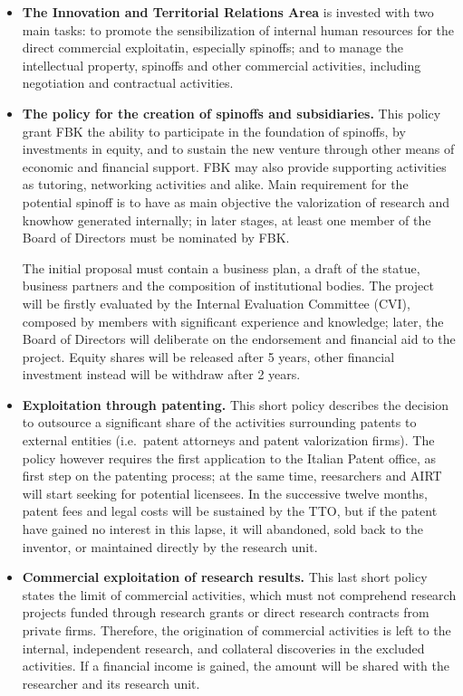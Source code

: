 \begin{itemize}

\item \textbf{The Innovation and Territorial Relations Area} is invested with two main tasks: to promote the sensibilization of internal human resources for the direct commercial exploitatin, especially spinoffs; and to manage the intellectual property, spinoffs and other commercial activities, including negotiation and contractual activities. 

\item \textbf{The policy for the creation of spinoffs and subsidiaries.} This policy grant FBK the ability to participate in the foundation of spinoffs, by investments in equity, and to sustain the new venture through other means of economic and financial support. FBK may also provide supporting activities as tutoring, networking activities and alike. Main requirement for the potential spinoff is to have as main objective the valorization of research and knowhow generated internally; in later stages, at least one member of the Board of Directors must be nominated by FBK.

The initial proposal must contain a business plan, a draft of the statue, business partners and the composition of institutional bodies. The project will be firstly evaluated by the Internal Evaluation Committee (CVI), composed by members with significant experience and knowledge; later, the Board of Directors will deliberate on the endorsement and financial aid to the project. Equity shares will be released after 5 years, other financial investment instead will be withdraw after 2 years.

\item \textbf{Exploitation through patenting.} This short policy describes the decision to outsource a significant share of the activities surrounding patents to external entities (i.e.\ patent attorneys and patent valorization firms). The policy however requires the first application to the Italian Patent office, as first step on the patenting process; at the same time, reesarchers and AIRT will start seeking for potential licensees. In the successive twelve months, patent fees and legal costs will be sustained by the TTO, but if the patent have gained no interest in this lapse, it will abandoned, sold back to the inventor, or maintained directly by the research unit. 

\item \textbf{Commercial exploitation of research results.} This last short policy states the limit of commercial activities, which must not comprehend research projects funded through research grants or direct research contracts from private firms. Therefore, the origination of commercial activities is left to the internal, independent research, and collateral discoveries in the excluded activities. If a financial income is gained, the amount will be shared with the researcher and its research unit.

\end{itemize}

